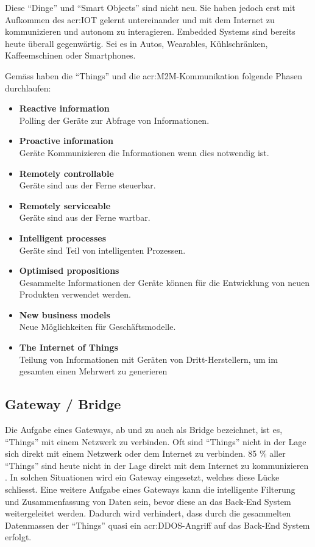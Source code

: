 Diese "`Dinge"' und "`Smart Objects"' sind nicht neu. Sie haben jedoch erst mit Aufkommen des \gls{acr:IOT} gelernt untereinander und mit dem Internet zu kommunizieren und autonom zu interagieren. Embedded Systems sind bereits heute überall gegenwärtig. Sei es in Autos, Wearables, Kühlschränken, Kaffeemschinen oder Smartphones.

Gemäss \cite{E:MachinaResearch:IoTWhitePaper} haben die "`Things"' und die \gls{acr:M2M}-Kommunikation folgende Phasen durchlaufen:

\begin{itemize} 
\item \textbf{Reactive information} \\Polling der Geräte zur Abfrage von Informationen.
\item \textbf{Proactive information} \\Geräte Kommunizieren die Informationen wenn dies notwendig ist.
\item \textbf{Remotely controllable} \\Geräte sind aus der Ferne steuerbar.
\item \textbf{Remotely serviceable} \\Geräte sind aus der Ferne wartbar.
\item \textbf{Intelligent processes} \\Geräte sind Teil von intelligenten Prozessen.
\item \textbf{Optimised propositions} \\Gesammelte Informationen der Geräte können für die Entwicklung von neuen Produkten verwendet werden.
\item \textbf{New business models} \\Neue Möglichkeiten für Geschäftsmodelle.
\item \textbf{The Internet of Things} \\Teilung von Informationen mit Geräten von Dritt-Herstellern, um im gesamten einen Mehrwert zu generieren
\end{itemize}

\subsection{Gateway / Bridge}
Die Aufgabe eines Gateways, ab und zu auch als Bridge bezeichnet, ist es, "`Things"' mit einem Netzwerk zu verbinden. Oft sind "`Things"' nicht in der Lage sich direkt mit einem Netzwerk oder dem Internet zu verbinden. 85 \% aller "`Things"' sind heute nicht in der Lage direkt mit dem Internet zu kommunizieren \cite[S. 2]{E:Intel:WhitePaper:DevelopingSolutionsIoT}. In solchen Situationen wird ein Gateway eingesetzt, welches diese Lücke schliesst. Eine weitere Aufgabe eines Gateways kann die intelligente Filterung und Zusammenfassung von Daten sein, bevor diese an das Back-End System weitergeleitet werden. Dadurch wird verhindert, dass durch die gesammelten Datenmassen der "`Things"' quasi ein \gls{acr:DDOS}-Angriff auf das Back-End System erfolgt.


